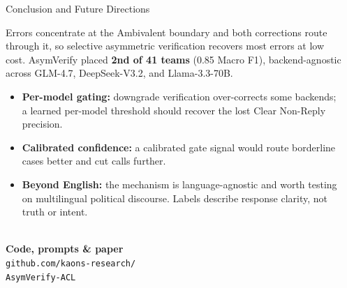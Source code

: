 \documentclass[final]{beamer}
\newlength{\sepwidth}\setlength{\sepwidth}{0.025\paperwidth}
\newlength{\triW}\setlength{\triW}{0.30\paperwidth}
\newlength{\fullwidth}\setlength{\fullwidth}{\dimexpr3\triW+2\sepwidth\relax}
\newcommand{\separatorcolumn}{\begin{column}{\sepwidth}\end{column}}
\begin{document}
\begin{frame}[t]
\begin{columns}[t]
\separatorcolumn
\begin{column}{\fullwidth}
  \begin{block}{Conclusion and Future Directions}
    \begin{minipage}[t]{0.66\linewidth}
      \vspace{0pt}
      Errors concentrate at the Ambivalent boundary and both corrections route through it,
      so selective asymmetric verification recovers most errors at low cost. AsymVerify placed
      \textbf{2nd of 41 teams} (0.85 Macro F1), backend-agnostic across GLM-4.7,
      DeepSeek-V3.2, and Llama-3.3-70B.
      \begin{itemize}
        \item \textbf{Per-model gating:} downgrade verification over-corrects some backends; a
          learned per-model threshold should recover the lost Clear Non-Reply precision.
        \item \textbf{Calibrated confidence:} a calibrated gate signal would route borderline
          cases better and cut calls further.
        \item \textbf{Beyond English:} the mechanism is language-agnostic and worth testing on
          multilingual political discourse. Labels describe response clarity, not truth or intent.
      \end{itemize}
    \end{minipage}\hfill
    \begin{minipage}[t]{0.30\linewidth}
      \centering\vspace{0pt}
      \begin{minipage}[t]{0.47\linewidth}
        \centering\vspace{0pt}
        \\[1mm]
        \textbf{Code, prompts \& paper}\\[0.5mm]
        {\scriptsize\texttt{github.com/kaons-research/}}\\
        {\scriptsize\texttt{AsymVerify-ACL}}
      \end{minipage}\hfill
      \begin{minipage}[t]{0.47\linewidth}

\end{minipage}
\end{minipage}
\end{block}
\end{column}
\end{columns}
\end{frame}
\end{document}
